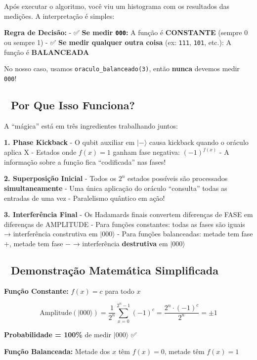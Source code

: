 \documentclass[
  brazilian,
]{report}
\begin{document}
Após executar o algoritmo, você viu um histograma com os resultados das
medições. A interpretação é simples:

\textbf{Regra de Decisão:} - ✅ \textbf{Se medir \texttt{000}:} A função
é \textbf{CONSTANTE} (sempre 0 ou sempre 1) - ✅ \textbf{Se medir
qualquer outra coisa} (ex: \texttt{111}, \texttt{101}, etc.): A função é
\textbf{BALANCEADA}

No nosso caso, usamos \texttt{oraculo\_balanceado(3)}, então
\textbf{nunca} devemos medir \texttt{000}!

\subsection{🔬 Por Que Isso Funciona?}\label{por-que-isso-funciona}

A ``mágica'' está em três ingredientes trabalhando juntos:

\textbf{1. Phase Kickback} - O qubit auxiliar em \(|-\rangle\) causa
kickback quando o oráculo aplica X - Estados onde \(f(x) = 1\) ganham
fase negativa: \((-1)^{f(x)}\) - A informação sobre a função fica
``codificada'' nas fases!

\textbf{2. Superposição Inicial} - Todos os \(2^n\) estados possíveis
são processados \textbf{simultaneamente} - Uma única aplicação do
oráculo ``consulta'' todas as entradas de uma vez - Paralelismo quântico
em ação!

\textbf{3. Interferência Final} - Os Hadamards finais convertem
diferenças de FASE em diferenças de AMPLITUDE - Para funções constantes:
todas as fases são iguais → interferência construtiva em \(|000\rangle\)
- Para funções balanceadas: metade tem fase +, metade tem fase − →
interferência \textbf{destrutiva} em \(|000\rangle\)

\subsection{🧮 Demonstração Matemática
Simplificada}\label{demonstrauxe7uxe3o-matemuxe1tica-simplificada}

\textbf{Função Constante:} \(f(x) = c\) para todo \(x\)

\[\text{Amplitude}(|000\rangle) = \frac{1}{2^n}\sum_{x=0}^{2^n-1} (-1)^c = \frac{2^n \cdot (-1)^c}{2^n} = \pm 1\]

\textbf{Probabilidade = 100\%} de medir \(|000\rangle\) ✅

\textbf{Função Balanceada:} Metade dos \(x\) têm \(f(x)=0\), metade têm
\(f(x)=1\)
\end{document}
